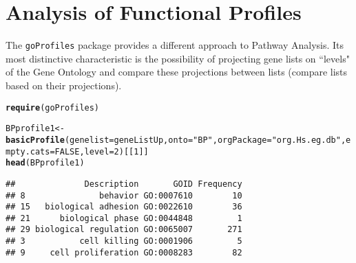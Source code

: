\documentclass{article}\usepackage[]{graphicx}\usepackage[]{color}
\makeatletter
\newcommand{\hlnum}[1]{\textcolor[rgb]{0.686,0.059,0.569}{#1}}%
\newcommand{\hlstr}[1]{\textcolor[rgb]{0.192,0.494,0.8}{#1}}%
\newcommand{\hlstd}[1]{\textcolor[rgb]{0.345,0.345,0.345}{#1}}%
\newcommand{\hlkwb}[1]{\textcolor[rgb]{0.69,0.353,0.396}{#1}}%
\newcommand{\hlkwc}[1]{\textcolor[rgb]{0.333,0.667,0.333}{#1}}%
\newcommand{\hlkwd}[1]{\textcolor[rgb]{0.737,0.353,0.396}{\textbf{#1}}}%
\newenvironment{kframe}{%
 \def\at@end@of@kframe{}%
 \ifinner\ifhmode%
  \def\at@end@of@kframe{\end{minipage}}%
  \begin{minipage}{\columnwidth}%
 \fi\fi%
 \def\FrameCommand##1{\hskip\@totalleftmargin \hskip-\fboxsep
 \colorbox{shadecolor}{##1}\hskip-\fboxsep
     \hskip-\linewidth \hskip-\@totalleftmargin \hskip\columnwidth}%
 \MakeFramed {\advance\hsize-\width
   \@totalleftmargin\z@ \linewidth\hsize
   \@setminipage}}%
 {\par\unskip\endMakeFramed%
 \at@end@of@kframe}
\newenvironment{knitrout}{}{} %
\makeatother
\begin{document}
\section{Analysis of Functional Profiles}

The \texttt{goProfiles} package provides a different approach to Pathway Analysis. Its most distinctive characteristic is the possibility of projecting gene lists on ``levels" of the Gene Ontology and compare these projections between lists (compare lists based on their projections).

\begin{knitrout}
\color{fgcolor}\begin{kframe}
\begin{alltt}
\hlkwd{require}\hlstd{(goProfiles)}
\end{alltt}


{\ttfamily\noindent\itshape\color{messagecolor}{\#\# Loading required package: goProfiles}}

{\ttfamily\noindent\itshape\color{messagecolor}{\#\# Loading required package: CompQuadForm}}

{\ttfamily\noindent\itshape\color{messagecolor}{\#\# Loading required package: stringr}}

{\ttfamily\noindent\itshape\color{messagecolor}{\#\# \\\#\# Attaching package: 'stringr'}}

{\ttfamily\noindent\itshape\color{messagecolor}{\#\# The following object is masked from 'package:graph':\\\#\# \\\#\#\ \ \ \  boundary}}\begin{alltt}
\hlstd{BPprofile1}\hlkwb{<-} \hlkwd{basicProfile}\hlstd{(}\hlkwc{genelist}\hlstd{=geneListUp,} \hlkwc{onto}\hlstd{=}\hlstr{"BP"}\hlstd{,} \hlkwc{orgPackage}\hlstd{=}\hlstr{"org.Hs.eg.db"}\hlstd{,} \hlkwc{empty.cats}\hlstd{=}\hlnum{FALSE}\hlstd{,} \hlkwc{level}\hlstd{=}\hlnum{2}\hlstd{)[[}\hlnum{1}\hlstd{]]}
\hlkwd{head}\hlstd{(BPprofile1)}
\end{alltt}
\begin{verbatim}
##              Description       GOID Frequency
## 8               behavior GO:0007610        10
## 15   biological adhesion GO:0022610        36
## 21      biological phase GO:0044848         1
## 29 biological regulation GO:0065007       271
## 3           cell killing GO:0001906         5
## 9     cell proliferation GO:0008283        82
\end{verbatim}
\end{kframe}
\end{knitrout}
\end{document}
